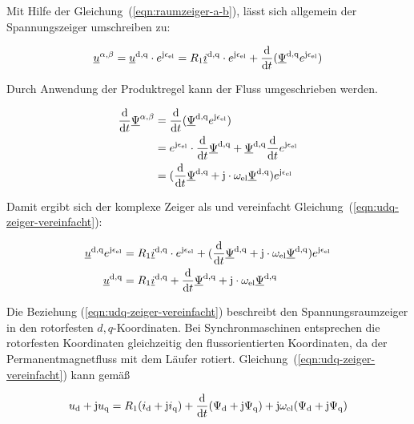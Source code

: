 Mit Hilfe der Gleichung~(\ref{eqn:raumzeiger-a-b}), lässt sich allgemein der Spannungszeiger umschreiben zu:

\begin{align}
	\underline{u}^{\alpha,\beta} = \underline{u}^{\mathrm{d,q}}\cdot e^{\mathrm{j}\epsilon_{\mathrm{el}}} = R_{\mathrm{1}}\underline{i}^{\mathrm{d,q}}\cdot e^{\mathrm{j}\epsilon_{\mathrm{el}}} + \frac{\mathrm{d}}{\mathrm{d}t}(\underline{\Psi}^{\mathrm{d,q}}e^{\mathrm{j}\epsilon_{\mathrm{el}}})
\end{align}

Durch Anwendung der Produktregel kann der Fluss umgeschrieben werden.

\begin{align}
	\frac{\mathrm{d}}{\mathrm{d}t}\underline{\Psi}^{\alpha,\beta} &= \frac{\mathrm{d}}{\mathrm{d}t}(\underline{\Psi}^{\mathrm{d,q}}e^{\mathrm{j}\epsilon_{\mathrm{el}}}) \nonumber \\
														&= e^{\mathrm{j}\epsilon_{\mathrm{el}}} \cdot \frac{\mathrm{d}}{\mathrm{d}t}\underline{\Psi}^{\mathrm{d,q}} + \underline{\Psi}^{\mathrm{d,q}} \frac{\mathrm{d}}{\mathrm{d}t}e^{\mathrm{j}\epsilon_{\mathrm{el}}} \\
														&= (\frac{\mathrm{d}}{\mathrm{d}t}\underline{\Psi}^{\mathrm{d,q}}+\mathrm{j}\cdot \omega_{\mathrm{el}}\underline{\Psi}^{\mathrm{d,q}})e^{\mathrm{j}\epsilon_{\mathrm{el}}}
\end{align}

Damit ergibt sich der komplexe Zeiger als und vereinfacht Gleichung~(\ref{eqn:udq-zeiger-vereinfacht}):

\begin{align}
	\underline{u}^{\mathrm{d,q}}e^{\mathrm{j}\epsilon_{\mathrm{el}}} &= R_{\mathrm{1}}\underline{i}^{\mathrm{d,q}}\cdot e^{\mathrm{j}\epsilon_{\mathrm{el}}} + (\frac{\mathrm{d}}{\mathrm{d}t}\underline{\Psi}^{\mathrm{d,q}}+\mathrm{j}\cdot \omega_{\mathrm{el}}\underline{\Psi}^{\mathrm{d,q}})e^{\mathrm{j}\epsilon_{\mathrm{el}}}\\
	\underline{u}^{\mathrm{d,q}} &= R_{\mathrm{1}}\underline{i}^{\mathrm{d,q}} + \frac{\mathrm{d}}{\mathrm{d}t}\underline{\Psi}^{\mathrm{d,q}}+\mathrm{j}\cdot \omega_{\mathrm{el}}\underline{\Psi}^{\mathrm{d,q}}	  \label{eqn:udq-zeiger-vereinfacht}
\end{align}

Die Beziehung (\ref{eqn:udq-zeiger-vereinfacht}) beschreibt den Spannungsraumzeiger in den rotorfesten $d,q$-Koordinaten.
Bei Synchronmaschinen entsprechen die rotorfesten Koordinaten gleichzeitig den flussorientierten Koordinaten, da der Permanentmagnetfluss mit dem Läufer rotiert.
Gleichung~(\ref{eqn:udq-zeiger-vereinfacht}) kann gemäß

\begin{align}
	u_{\mathrm{d}} + \mathrm{j}u_{\mathrm{q}} = R_{\mathrm{1}}(i_{\mathrm{d}}+\mathrm{j}i_{\mathrm{q}}) + \frac{\mathrm{d}}{\mathrm{d}t}(\Psi_{\mathrm{d}}+\mathrm{j}\Psi_{\mathrm{q}}) + \mathrm{j}\omega_{\mathrm{el}}(\Psi_{\mathrm{d}}+\mathrm{j}\Psi_{\mathrm{q}})
\end{align}


